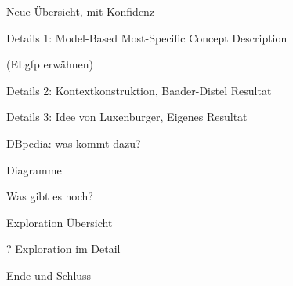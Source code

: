 \documentclass[ngerman]{beamer}
\begin{document}
\begin{frame}
  Neue Übersicht, mit Konfidenz
\end{frame}

\begin{frame}
  Details 1: Model-Based Most-Specific Concept Description

  (ELgfp erwähnen)
\end{frame}

\begin{frame}
  Details 2: Kontextkonstruktion, Baader-Distel Resultat
\end{frame}

\begin{frame}
  Details 3: Idee von Luxenburger, Eigenes Resultat
\end{frame}

\begin{frame}
  DBpedia: was kommt dazu?
\end{frame}

\begin{frame}
  Diagramme
\end{frame}

\begin{frame}
  Was gibt es noch?
\end{frame}

\begin{frame}
  Exploration Übersicht
\end{frame}

\begin{frame}
  ? Exploration im Detail
\end{frame}

\begin{frame}
  Ende und Schluss
\end{frame}
\end{document}
